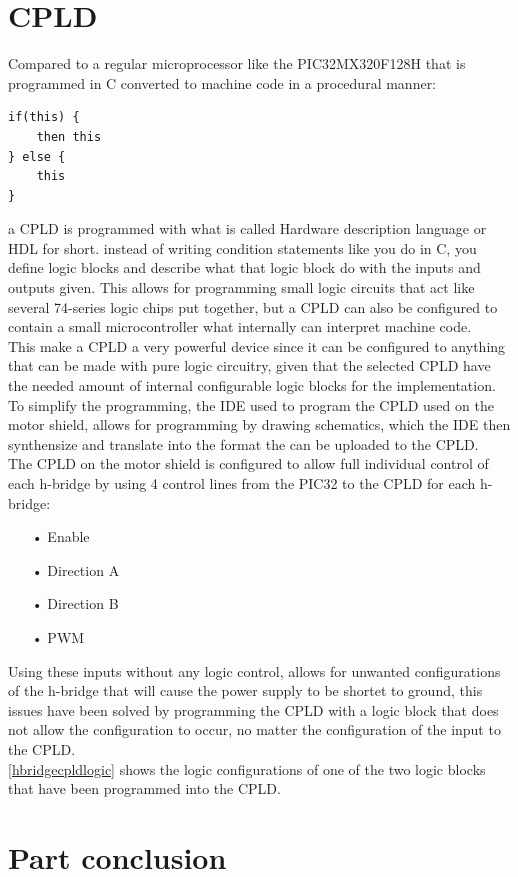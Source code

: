 \section{CPLD}
Compared to a regular microprocessor like the PIC32MX320F128H that is programmed in C converted to machine code in a procedural manner:
\begin{lstlisting}
if(this) {
	then this
} else {
	this
}
\end{lstlisting}
a CPLD is programmed with what is called Hardware description language or HDL for short.
instead of writing condition statements like you do in C, you define logic blocks and describe what that logic block do with the inputs and outputs given. \cite{HDL}
This allows for programming small logic circuits that act like several 74-series logic chips put together, but a CPLD can also be configured to contain a small microcontroller what internally can interpret machine code.\\ 
This make a CPLD a very powerful device since it can be configured to anything that can be made with pure logic circuitry, given that the selected CPLD have the needed amount of internal configurable logic blocks for the implementation. \cite{CPLD}
To simplify the programming, the IDE used to program the CPLD used on the motor shield, allows for programming by drawing schematics, which the IDE then synthensize and translate into the format the can be uploaded to the CPLD.\\
The CPLD on the motor shield is configured to allow full individual control of each h-bridge by using 4 control lines from the PIC32 to the CPLD for each h-bridge:
\begin{enumerate}
	\item[•]Enable
	\item[•]Direction A
	\item[•]Direction B
	\item[•]PWM
\end{enumerate}
Using these inputs without any logic control, allows for unwanted configurations of the h-bridge that will cause the power supply to be shortet to ground, this issues have been solved by programming the CPLD with a logic block that does not allow the configuration to occur, no matter the configuration of the input to the CPLD.\\
\ref{hbridgecpldlogic} shows the logic configurations of one of the two logic blocks that have been programmed into the CPLD.
\section{Part conclusion}


